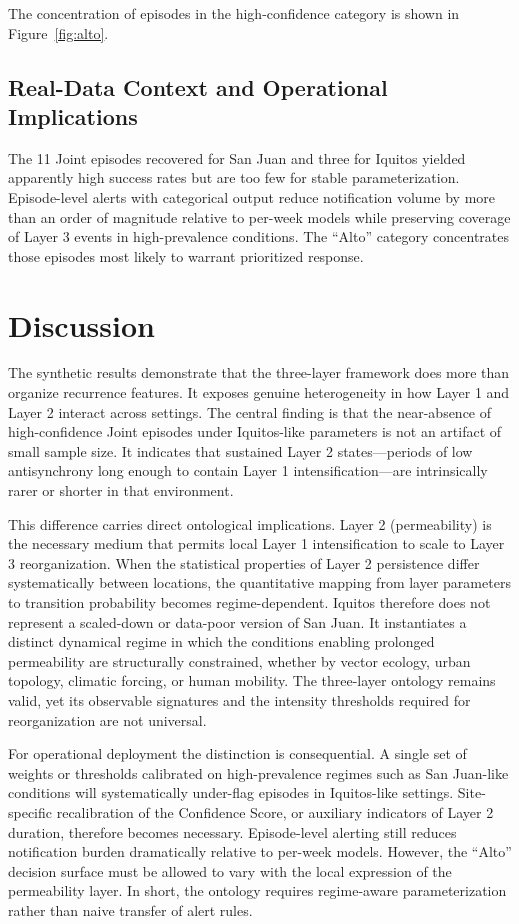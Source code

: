 \documentclass[11pt,a4paper]{article}
\begin{document}
The concentration of episodes in the high-confidence category is shown in Figure~\ref{fig:alto}.

\subsection{Real-Data Context and Operational Implications}

The 11 Joint episodes recovered for San Juan and three for Iquitos yielded apparently high success rates but are too few for stable parameterization. Episode-level alerts with categorical output reduce notification volume by more than an order of magnitude relative to per-week models while preserving coverage of Layer 3 events in high-prevalence conditions. The “Alto” category concentrates those episodes most likely to warrant prioritized response.

\section{Discussion}

The synthetic results demonstrate that the three-layer framework does more than organize recurrence features. It exposes genuine heterogeneity in how Layer 1 and Layer 2 interact across settings. The central finding is that the near-absence of high-confidence Joint episodes under Iquitos-like parameters is not an artifact of small sample size. It indicates that sustained Layer 2 states---periods of low antisynchrony long enough to contain Layer 1 intensification---are intrinsically rarer or shorter in that environment.

This difference carries direct ontological implications. Layer 2 (permeability) is the necessary medium that permits local Layer 1 intensification to scale to Layer 3 reorganization. When the statistical properties of Layer 2 persistence differ systematically between locations, the quantitative mapping from layer parameters to transition probability becomes regime-dependent. Iquitos therefore does not represent a scaled-down or data-poor version of San Juan. It instantiates a distinct dynamical regime in which the conditions enabling prolonged permeability are structurally constrained, whether by vector ecology, urban topology, climatic forcing, or human mobility. The three-layer ontology remains valid, yet its observable signatures and the intensity thresholds required for reorganization are not universal.

For operational deployment the distinction is consequential. A single set of weights or thresholds calibrated on high-prevalence regimes such as San Juan-like conditions will systematically under-flag episodes in Iquitos-like settings. Site-specific recalibration of the Confidence Score, or auxiliary indicators of Layer 2 duration, therefore becomes necessary. Episode-level alerting still reduces notification burden dramatically relative to per-week models. However, the ``Alto'' decision surface must be allowed to vary with the local expression of the permeability layer. In short, the ontology requires regime-aware parameterization rather than naive transfer of alert rules.
\end{document}

